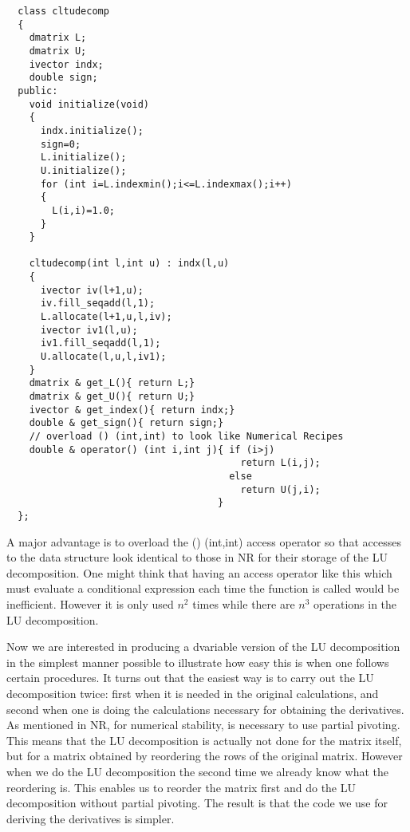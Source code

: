 \documentclass[12pt,letterpaper]{report}
\newcommand\help[1]{\color{red}{\it #1 }\normalcolor}
\begin{document}
\begin{verbatim}
  class cltudecomp
  {
    dmatrix L;
    dmatrix U;
    ivector indx;
    double sign;
  public:
    void initialize(void) 
    { 
      indx.initialize();
      sign=0;
      L.initialize(); 
      U.initialize(); 
      for (int i=L.indexmin();i<=L.indexmax();i++)
      {
        L(i,i)=1.0;
      }
    }

    cltudecomp(int l,int u) : indx(l,u)
    {
      ivector iv(l+1,u);
      iv.fill_seqadd(l,1);
      L.allocate(l+1,u,l,iv);
      ivector iv1(l,u);
      iv1.fill_seqadd(l,1);
      U.allocate(l,u,l,iv1);
    }
    dmatrix & get_L(){ return L;}
    dmatrix & get_U(){ return U;}
    ivector & get_index(){ return indx;}
    double & get_sign(){ return sign;}
    // overload () (int,int) to look like Numerical Recipes
    double & operator() (int i,int j){ if (i>j)
                                         return L(i,j);
                                       else
                                         return U(j,i);
                                     }
  };
\end{verbatim}

\help{A request from a geezer with old eyes. It is hard to distinguish
between `l' (lower case `L') and `1' (the integer number) in some type
faces. It causes me no end of trouble.}

A major advantage is to overload the () (int,int) access operator
so that accesses to the data structure look identical to those in NR for
their storage of the LU decomposition. One might think that having an access operator like this which must evaluate a conditional expression each time the function is called would be inefficient. However it is only used $n^2$ times
while there are $n^3$ operations in the LU decomposition. 
\help{This is a great assistance in writing the adjoint, but is it
possible to go back and optimize by accessing L and U directly in
``production'' code?}

Now we are interested in producing a dvariable version of the LU decomposition
in the simplest manner possible to illustrate how easy this is when one follows
certain procedures.  It turns out that the easiest way is to carry out the
LU decomposition twice: first when it is needed in the original calculations,
and second when one is doing the calculations necessary for obtaining the
derivatives. As mentioned in NR, for numerical stability, is necessary to
use partial pivoting.  This means that the LU decomposition is actually not
done for the matrix itself, but for a matrix obtained by reordering the rows of
the original matrix. However when we do the LU decomposition the second time
we already know what the reordering is. This enables us to reorder the matrix
first and do the LU decomposition without partial pivoting. The result is that
the code we use for deriving the derivatives is simpler.
\end{document}
